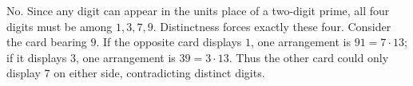 No. Since any digit can appear in the units place of a two-digit prime, all four digits must be among $1,3,7,9$. Distinctness forces exactly these four. Consider the card bearing $9$. If the opposite card displays $1$, one arrangement is $91=7\cdot13$; if it displays $3$, one arrangement is $39=3\cdot13$. Thus the other card could only display $7$ on either side, contradicting distinct digits.
